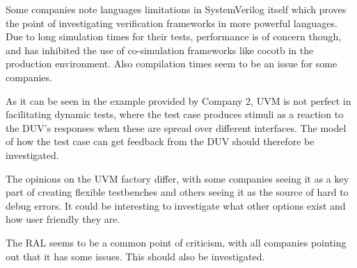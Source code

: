 \documentclass[11pt,a4paper]{report}
\begin{document}
Some companies note languages limitations in SystemVerilog itself which proves the point of investigating
verification frameworks in more powerful languages. Due to long simulation times for their tests, performance is of
concern though, and has inhibited the use of co-simulation frameworks like cocotb in the production environment. Also
compilation times seem to be an issue for some companies.

As it can be seen in the example provided by Company 2, UVM is not perfect in facilitating dynamic tests, where the
test case produces stimuli as a reaction to the DUV's responses when these are spread over different interfaces. The
model of how the test case can get feedback from the DUV should therefore be investigated.

The opinions on the UVM factory differ, with some companies seeing it as a key part of creating flexible testbenches
and others seeing it as the source of hard to debug errors. It could be interesting to investigate what other options
exist and how user friendly they are.

The RAL seems to be a common point of criticism, with all companies pointing out that it has some issues. This should
also be investigated.

\end{document}
